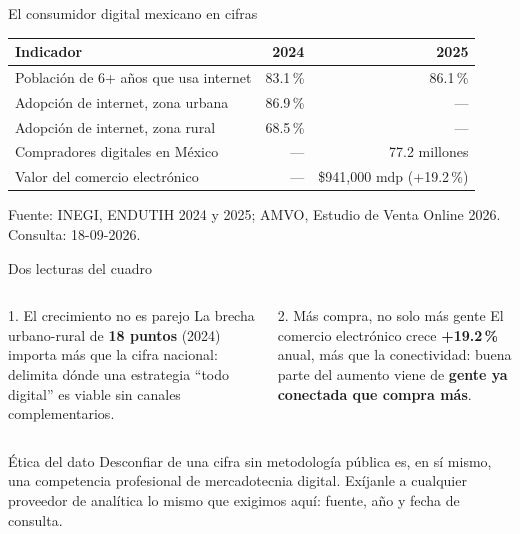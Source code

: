 \documentclass[aspectratio=169,xcolor=dvipsnames]{beamer}
\newcommand{\fuente}[1]{{\tiny\color{IPNgris}Fuente: #1}}
\begin{document}
\begin{frame}{El consumidor digital mexicano en cifras}
\begin{center}
\begin{tabular}{@{}lrr@{}}
\toprule
\textbf{Indicador} & \textbf{2024} & \textbf{2025} \\
\midrule
Población de 6+ años que usa internet & 83.1\,\% & 86.1\,\% \\
Adopción de internet, zona urbana & 86.9\,\% & --- \\
Adopción de internet, zona rural & 68.5\,\% & --- \\
Compradores digitales en México & --- & 77.2 millones \\
Valor del comercio electrónico & --- & \$941{,}000 mdp (+19.2\,\%) \\
\bottomrule
\end{tabular}
\end{center}
\vspace{4pt}
\fuente{INEGI, ENDUTIH 2024 y 2025; AMVO, Estudio de Venta Online 2026. Consulta: 18-09-2026.}
\end{frame}

\begin{frame}{Dos lecturas del cuadro}
\begin{columns}[T]
  \begin{block}{1. El crecimiento no es parejo}
    \small La brecha urbano-rural de \textbf{18 puntos} (2024) importa más que la cifra nacional: delimita dónde una estrategia \enquote{todo digital} es viable sin canales complementarios.
  \end{block}
  \begin{block}{2. Más compra, no solo más gente}
    \small El comercio electrónico crece \textbf{+19.2\,\%} anual, más que la conectividad: buena parte del aumento viene de \textbf{gente ya conectada que compra más}.
  \end{block}
\end{columns}
\vspace{8pt}
\begin{alertblock}{Ética del dato}
  \small Desconfiar de una cifra sin metodología pública es, en sí mismo, una competencia profesional de mercadotecnia digital. Exíjanle a cualquier proveedor de analítica lo mismo que exigimos aquí: fuente, año y fecha de consulta.
\end{alertblock}
\end{frame}

\end{document}
